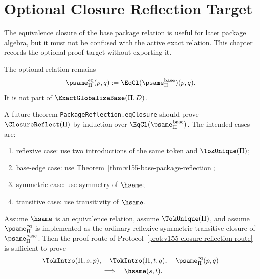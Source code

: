 \chapter{Optional Closure Reflection Target}
\label{ch:v155-closure-reflection-target}

The equivalence closure of the base package relation is useful for later package algebra, but it must not be confused with the active exact relation. This chapter records the optional proof target without exporting it.

\begin{definition}
\label{def:v155-psame-eq-target}
The optional relation remains
\[
  \psame_{\Pi}^{\mathrm{eq}}(p,q) := \EqCl(\psame_{\Pi}^{\mathrm{base}})(p,q).
\]
It is not part of \(\ExactGlobalizeBase(\Pi,D)\).
\end{definition}

\begin{protocol}
\label{prot:v155-closure-reflection-route}
A future theorem \texttt{PackageReflection.eqClosure} should prove \(\ClosureReflect(\Pi)\) by induction over \(\EqCl(\psame_{\Pi}^{\mathrm{base}})\). The intended cases are:
\begin{enumerate}
  \item reflexive case: use two introductions of the same token and \(\TokUnique(\Pi)\);
  \item base-edge case: use Theorem~\ref{thm:v155-base-package-reflection};
  \item symmetric case: use symmetry of \(\hsame\);
  \item transitive case: use transitivity of \(\hsame\).
\end{enumerate}
\end{protocol}

\begin{proposition}
\label{prop:v155-conditional-closure-reflection-schema}
Assume \(\hsame\) is an equivalence relation, assume \(\TokUnique(\Pi)\), and assume \(\psame_{\Pi}^{\mathrm{eq}}\) is implemented as the ordinary reflexive-symmetric-transitive closure of \(\psame_{\Pi}^{\mathrm{base}}\). Then the proof route of Protocol~\ref{prot:v155-closure-reflection-route} is sufficient to prove
\[
\begin{aligned}
  &\TokIntro(\Pi,s,p),\quad \TokIntro(\Pi,t,q),\quad \psame_{\Pi}^{\mathrm{eq}}(p,q)\\
  &\hspace{3cm}\Longrightarrow\quad \hsame(s,t).
\end{aligned}
\]
\end{proposition}

